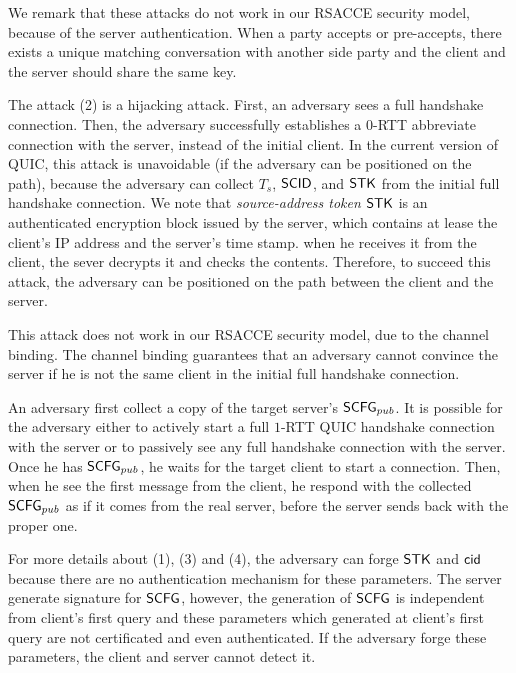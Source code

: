 We remark that these attacks do not work in our RSACCE security model, because of 
the server authentication. 
When a party accepts or pre-accepts,  there exists a unique matching conversation with another side party 
and the client and the server should share the same key. 

The attack  (2) is a hijacking attack. First, an adversary sees a full handshake connection.
Then, the adversary successfully establishes a $0$-RTT abbreviate connection with the server, 
instead of the initial client. 
In the current version of QUIC, this attack is unavoidable (if the adversary can be positioned on the path), 
because the adversary can collect $T_s$, $\mathsf{SCID}$, and $\mathsf{STK}$ from the initial full handshake connection. 
We note that \textit{source-address token} $\mathsf{STK}$ is an authenticated encryption block issued by the server, 
which contains at lease the client's IP address and the server's time stamp. 
when he receives it from the client, the sever decrypts it and checks the contents.
Therefore, to succeed this attack, the adversary can be positioned on the path between the client and the server.  

This attack does not work in our RSACCE security model, due to the channel binding.
The channel binding guarantees that an adversary cannot convince the server if he is not the same client in 
the initial full handshake connection.

An adversary first collect a copy of the target server's 
$\mathsf{SCFG}_{pub}$. It is possible for the adversary either to actively start a full $1$-RTT QUIC handshake connection with the server or to passively see any full handshake connection with the server. 
Once he has $\mathsf{SCFG}_{pub}$, he waits for the target client to start a connection. 
Then, when he see the first message from the client, he respond with the collected $\mathsf{SCFG}_{pub}$ 
as if it comes from the real server, before the server sends back with the proper one.
\fi

For more details about (1), (3) and (4), the adversary can forge
$\mathsf{STK}$ and $\mathsf{cid}$ because there are no authentication mechanism
for these parameters.
The server generate signature for $\mathsf{SCFG}$, however, the generation
of $\mathsf{SCFG}$ is independent from client's first query and these parameters
which generated at client's first query
are not certificated and even authenticated.
If the adversary forge these parameters, the client and server cannot
detect it.

